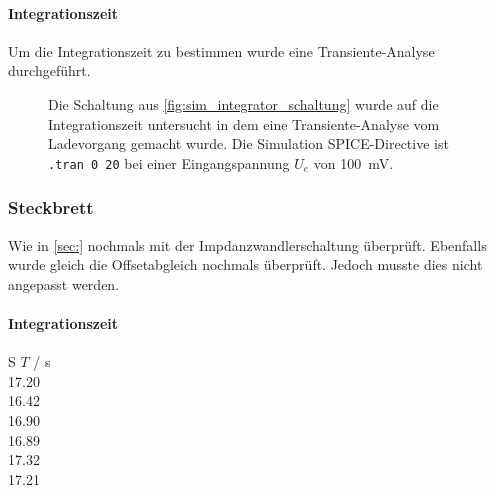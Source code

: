 \documentclass[12pt,english,ngerman]{scrartcl}
\begin{document}
\paragraph{Integrationszeit}
Um die Integrationszeit zu bestimmen wurde eine Transiente-Analyse durchgeführt.


\begin{figure}[H]
  \centering
  \caption{Die Schaltung aus \autoref{fig:sim_integrator_schaltung} wurde auf
  die Integrationszeit untersucht in dem eine Transiente-Analyse vom
  Ladevorgang gemacht wurde. Die Simulation SPICE-Directive ist \texttt{.tran 0 20} 
  bei einer Eingangspannung $U_e$ von \SI{100}{\milli\volt}.}
  \label{fig:sim_integrator_integrationszeit}
\end{figure}

\subsubsection{Steckbrett}
Wie in \autoref{sec:} nochmals mit der Impdanzwandlerschaltung überprüft.
Ebenfalls wurde gleich die Offsetabgleich nochmals überprüft. Jedoch musste
dies nicht angepasst werden.

\paragraph{Integrationszeit}

\begin{table}
  \caption{Messungen der Integrationszeit der realen Schaltung aus
  \autoref{fig:sim_integrator_schaltung}, wobei $T$ die Ladezeit bis am Ausgang
  \SI{10}{\volt} anliegt. Bei einem Ladespannung \SI{91.8}{\milli\volt}, einem
  Widerstand von \SI{21.9}{\kilo\ohm} und einer Kapazität von
  \SI{6.8}{\micro\farad} }
  \label{tab:messungen_integration}
  \centering
  \begin{tabular}[c]{S}
    {$T$ / \si{\second}} \\
    17.20 \\
    16.42 \\
    16.90 \\
    16.89 \\
    17.32 \\
    17.21 \\
  \end{tabular}
\end{table}
\end{document}
